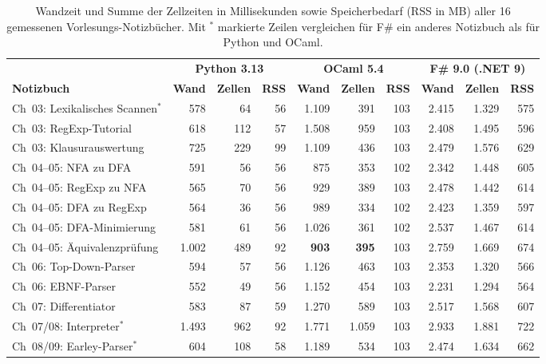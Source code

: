 \begin{table}[htbp]
  \centering
  \scriptsize
  \caption{Wandzeit und Summe der Zellzeiten in Millisekunden sowie Speicherbedarf (RSS in MB) aller 16 gemessenen Vorlesungs-Notizbücher.
  Mit $^{*}$ markierte Zeilen vergleichen für F\# ein anderes Notizbuch als für Python und OCaml.}
  \label{tab:macrobenchmarks}
  \begin{tabularx}{\textwidth}{Xrrrrrrrrr}
    \toprule
    & \multicolumn{3}{c}{\textbf{Python 3.13}} & \multicolumn{3}{c}{\textbf{OCaml 5.4}} & \multicolumn{3}{c}{\textbf{F\# 9.0 (.NET 9)}} \\
    \cmidrule(lr){2-4} \cmidrule(lr){5-7} \cmidrule(lr){8-10}
    \textbf{Notizbuch} & \textbf{Wand} & \textbf{Zellen} & \textbf{RSS} & \textbf{Wand} & \textbf{Zellen} & \textbf{RSS} & \textbf{Wand} & \textbf{Zellen} & \textbf{RSS} \\
    \midrule
    Ch~03: Lexikalisches Scannen$^{*}$ & 578 & 64 & 56 & 1.109 & 391 & 103 & 2.415 & 1.329 & 575 \\
    Ch~03: RegExp-Tutorial & 618 & 112 & 57 & 1.508 & 959 & 103 & 2.408 & 1.495 & 596 \\
    Ch~03: Klausurauswertung & 725 & 229 & 99 & 1.109 & 436 & 103 & 2.479 & 1.576 & 629 \\
    Ch~04--05: NFA zu DFA & 591 & 56 & 56 & 875 & 353 & 102 & 2.342 & 1.448 & 605 \\
    Ch~04--05: RegExp zu NFA & 565 & 70 & 56 & 929 & 389 & 103 & 2.478 & 1.442 & 614 \\
    Ch~04--05: DFA zu RegExp & 564 & 36 & 56 & 989 & 334 & 102 & 2.423 & 1.359 & 597 \\
    Ch~04--05: DFA-Minimierung & 581 & 61 & 56 & 1.026 & 361 & 102 & 2.537 & 1.467 & 614 \\
    Ch~04--05: Äquivalenzprüfung & 1.002 & 489 & 92 & \textbf{903} & \textbf{395} & 103 & 2.759 & 1.669 & 674 \\
    Ch~06: Top-Down-Parser & 594 & 57 & 56 & 1.126 & 463 & 103 & 2.353 & 1.320 & 566 \\
    Ch~06: EBNF-Parser & 552 & 49 & 56 & 1.152 & 454 & 103 & 2.231 & 1.294 & 564 \\
    Ch~07: Differentiator & 583 & 87 & 59 & 1.270 & 589 & 103 & 2.517 & 1.568 & 607 \\
    Ch~07/08: Interpreter$^{*}$ & 1.493 & 962 & 92 & 1.771 & 1.059 & 103 & 2.933 & 1.881 & 722 \\
    Ch~08/09: Earley-Parser$^{*}$ & 604 & 108 & 58 & 1.189 & 534 & 103 & 2.474 & 1.634 & 662 \\

\end{tabularx}
\end{table}
